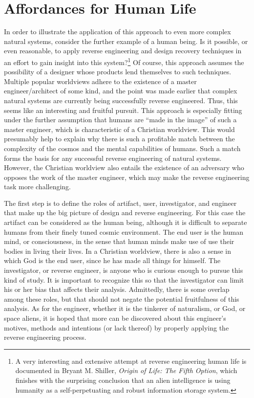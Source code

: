 
\section{Affordances for Human Life}

In order to illustrate the application of this approach to even more
complex natural systems, consider the further example of a human being.
Is it possible, or even reasonable, to apply reverse engineering and
design recovery techniques in an effort to gain insight into this
system?\footnote{
A very interesting and extensive attempt at reverse
engineering human life is documented in Bryant M. Shiller,
\textit{Origin of Life: The Fifth Option},\citep{shiller2004}
which finishes with the surprising conclusion that an alien
intelligence is using humanity as a self-perpetuating and robust
information storage system.
} Of course, this approach assumes the
possibility of a designer whose products lend themselves to such
techniques. Multiple popular worldviews adhere to the existence of a
master engineer/architect of some kind, and the point was made earlier
that complex natural systems are currently being successfully reverse
engineered. Thus, this seems like an interesting and fruitful pursuit.
This approach is especially fitting under the further assumption that
humans are “made in the image” of such a master engineer, which is
characteristic of a Christian worldview. This would presumably help to
explain why there is such a profitable match between the complexity of
the cosmos and the mental capabilities of humans. Such a
match forms the basis for any successful reverse engineering of natural
systems. However, the Christian worldview also entails the existence of
an adversary who opposes the work of the master engineer, which may
make the reverse engineering task more challenging.

The first step is to define the roles of artifact, user, investigator,
and engineer that make up the big picture of design and reverse
engineering. For this case the artifact can be considered as the human
being, although it is difficult to separate humans from their finely
tuned cosmic environment. The end user is the human mind, or
consciousness, in the sense that human minds make use of use their
bodies in living their lives. In a Christian worldview, there is also a
sense in which God is the end user, since he has made all things for
himself. The investigator, or reverse engineer, is anyone who is
curious enough to pursue this kind of study. It is important to
recognize this so that the investigator can limit his or her
bias that affects their analysis. Admittedly, there is some overlap among
these roles, but that should not negate the potential fruitfulness of
this analysis. As for the engineer, whether it is the tinkerer of
naturalism, or God, or space aliens, it is hoped that more can be
discovered about this engineer’s motives, methods and intentions (or
lack thereof) by properly applying the reverse engineering process. 

